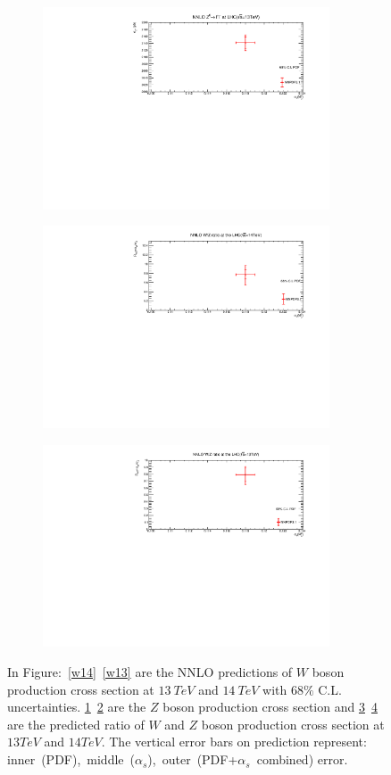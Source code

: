 \begin{figure}[H]{\label{WZ13_14}}
\begin{subfigure}{0.49\textwidth}
\label{z14}
\end{subfigure}
\begin{subfigure}{0.49\textwidth}
\includegraphics[height=6cm, width=\textwidth]{chapter4/Z13.pdf}
\vspace*{-6mm}
\caption{}
\label{z13}
\end{subfigure}
\begin{subfigure}{0.49\textwidth}
\includegraphics[height=6cm, width=\textwidth]{chapter4/Rwz14.pdf}
\vspace*{-6mm}
\caption{}
\label{rwz14}
\end{subfigure}
\begin{subfigure}{0.49\textwidth}
\includegraphics[height=6cm, width=\textwidth]{chapter4/Rwz13.pdf}
\vspace*{-6mm}
\caption{}
\label{rwz13}
\end{subfigure}
\caption{In Figure:~\ref{w14}~\ref{w13} are the NNLO predictions of $W$ boson production cross section at $13~TeV$ and $14~TeV$ with $68\%$ C.L. uncertainties. \ref{z14}~\ref{z13} are the $Z$ boson production cross section and \ref{rwz14}~\ref{rwz13} are the predicted ratio of $W$ and $Z$ boson production cross section at $13TeV$ and $14TeV$. The vertical error bars on prediction represent: inner~(PDF),~middle~($\alpha_{s}$),~outer~(PDF+$\alpha_{s}$~combined) error.} 
\label{13tev1}
\end{figure}


